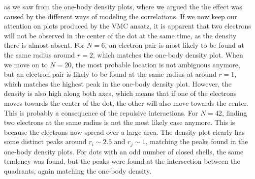 as we saw from the one-body density plots, where we argued the the effect was caused by the different ways of modeling the correlations. If we now keep our attention on plots produced by the VMC ansatz, it is apparent that two electrons will not be observed in the center of the dot at the same time, as the density there is almost absent. For $N=6$, an electron pair is most likely to be found at the same radius around $r=2$, which matches the one-body density plot. When we move on to $N=20$, the most probable location is not ambiguous anymore, but an electron pair is likely to be found at the same radius at around $r=1$, which matches the highest peak in the one-body density plot. However, the density is also high along both axes, which means that if one of the electrons moves towards the center of the dot, the other will also move towards the center. This is probably a consequence of the repulsive interactions. For $N=42$, finding two electrons at the same radius is not the most likely case anymore. This is because the electrons now spread over a large area. The density plot clearly has some distinct peaks around $r_i\sim 2.5$ and $r_j\sim 1$, matching the peaks found in the one-body density plots. For dots with an odd number of closed shells, the same tendency was found, but the peaks were found at the intersection between the quadrants, again matching the one-body density.

